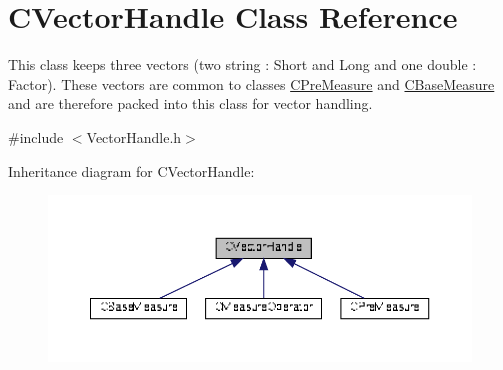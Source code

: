 \hypertarget{classCVectorHandle}{}\section{C\+Vector\+Handle Class Reference}
\label{classCVectorHandle}


This class keeps three vectors (two string \+: Short and Long and one double \+: Factor). These vectors are common to classes \hyperlink{classCPreMeasure}{C\+Pre\+Measure} and \hyperlink{classCBaseMeasure}{C\+Base\+Measure} and are therefore packed into this class for vector handling.  




{\ttfamily \#include $<$Vector\+Handle.\+h$>$}



Inheritance diagram for C\+Vector\+Handle\+:\nopagebreak
\begin{figure}[H]
\begin{center}
\leavevmode
\includegraphics[width=350pt]{d7/d40/classCVectorHandle__inherit__graph}
\end{center}
\end{figure}
